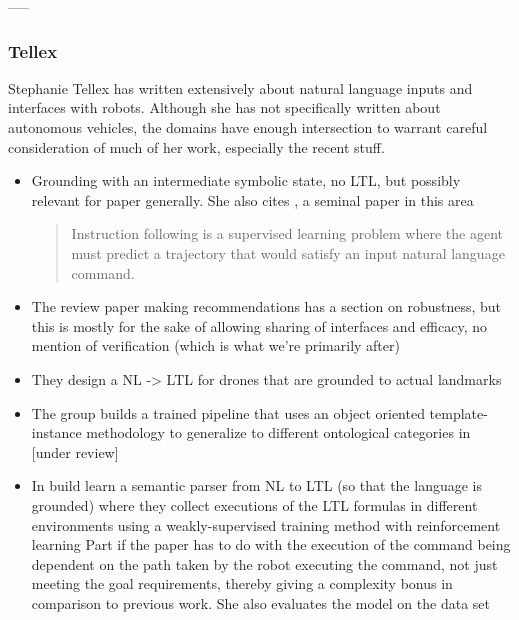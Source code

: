 \documentclass[a4paper, 11pt]{article}
\begin{document}
----- 





\subsubsection{Tellex}

Stephanie Tellex has written extensively about natural language inputs and
interfaces with robots. Although she has not specifically written about
autonomous vehicles, the domains have enough intersection to warrant careful
consideration of much of her work, especially the recent stuff.

\begin{itemize}

\item Grounding with an intermediate symbolic state, no LTL, but possibly
  relevant for paper generally. She also cites \cite{walkTalk}, a seminal paper in this area
\begin{quote}
Instruction following is a supervised learning problem
where the agent must predict a trajectory that would satisfy an
input natural language command. \cite{tellexInstr}
\end{quote}
\item The review paper \cite{MARGE2022101255} making recommendations has a
  section on robustness, but this is mostly for the sake of allowing sharing of
  interfaces and efficacy, no mention of verification (which is what we're
  primarily after)
\item They design a NL -> LTL for drones that are grounded to actual landmarks \cite{9197068}
\item The group builds a trained pipeline that uses an object oriented
  template-instance methodology to generalize to different ontological
  categories in  \cite{hsiung2021generalizing} [under review]

\item In \cite{patellearning} build learn a semantic parser from NL to LTL (so
that the language is grounded) where they collect executions of the LTL formulas
in different environments using a weakly-supervised training method with
reinforcement learning Part if the paper has to do with the execution of the
command being dependent on the path taken by the robot executing the command,
not just meeting the goal requirements, thereby giving a complexity bonus in
comparison to previous work. She also evaluates the model on the \cite{walkTalk}
data set
\end{itemize}
\end{document}
